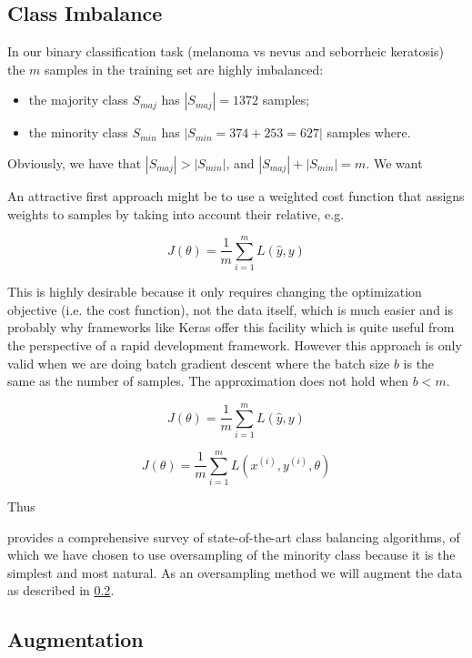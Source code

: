 \subsection{Class Imbalance}
\label{subsection:classimbalance}

In our binary classification task (melanoma vs nevus and seborrheic keratosis) the $m$ samples in the training set are highly imbalanced:

\begin{itemize}
    \item the majority class $S_{maj}$ has $|S_{maj}| = 1372$ samples;
    \item the minority class $S_{min}$ has $|S_{min} = 374 + 253 = 627|$ samples where.
\end{itemize}

Obviously, we have that $|S_{maj}| > |S_{min}|$, and $|S_{maj}| + |S_{min}| = m$. We want


An attractive first approach might be to use a weighted cost function that assigns weights to samples by taking into account their relative, e.g.

$$
J(\theta) = \frac{1}{m} \sum^{m}_{i=1} L(\hat{y}, y)
$$

This is highly desirable because it only requires changing the optimization objective (i.e. the cost function), not the data itself, which is much easier and is probably why frameworks like Keras offer this facility which is quite useful from the perspective of a rapid development framework. However this approach is only valid when we are doing batch gradient descent where the batch size $b$ is the same as the number of samples. The approximation does not hold when $b < m$.

$$
J(\theta) = \frac{1}{m} \sum^{m}_{i=1} L(\hat{y}, y)
$$

$$
J(\theta) = \frac{1}{m} \sum_{i=1}^{m} L(x^{(i)}, y^{(i)}, \theta)
$$

Thus

\cite{haibo2009} provides a comprehensive survey of state-of-the-art class balancing algorithms, of which we have chosen to use oversampling of the minority class because it is the simplest and most natural. As an oversampling method we will augment the data as described in \ref{subsection:augmentation}.

\subsection{Augmentation}
\label{subsection:augmentation}

